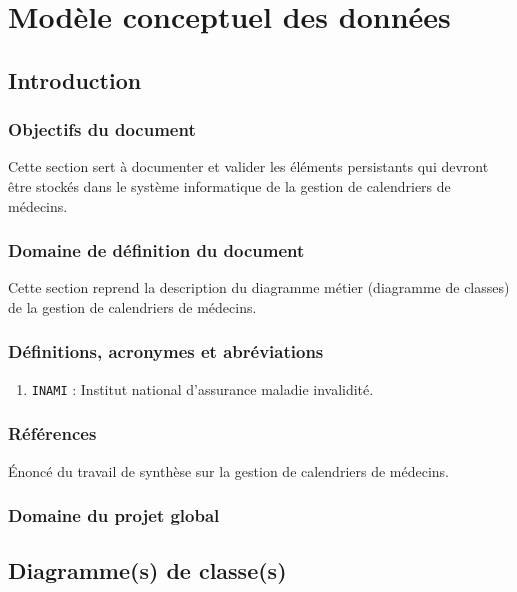 \chapter{Modèle conceptuel des données}

\section{Introduction}

\subsection{Objectifs du document}

Cette section sert à documenter et valider les éléments persistants qui devront
être stockés dans le système informatique de la gestion de calendriers de médecins.

\subsection{Domaine de définition du document}

Cette section reprend la description du diagramme métier (diagramme de classes) de la gestion de 
calendriers de médecins.

\subsection{Définitions, acronymes et abréviations}

\begin{enumerate}

\item \texttt{INAMI} : Institut national d'assurance maladie invalidité.

\end{enumerate}

\subsection{Références}

Énoncé du travail de synthèse sur la gestion de calendriers de médecins.

\subsection{Domaine du projet global}
\newpage
\section{Diagramme(s) de classe(s)}

